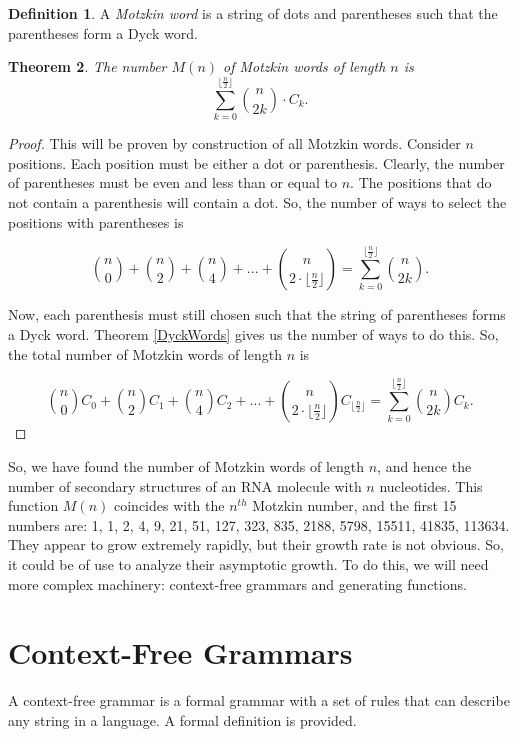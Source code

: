 \documentclass[11pt]{amsart}
\theoremstyle{plain}%
\newtheorem{thm}{Theorem}[section]
\theoremstyle{definition}
\newtheorem{defin}[thm]{{Definition}}
\theoremstyle{remark}
\numberwithin{equation}{thm}
\begin{document}
\begin{defin}
A \textit{Motzkin word} is a string of dots and parentheses such that the parentheses form a Dyck word.
\end{defin}

\begin{thm}
    The number $M(n)$ of Motzkin words of length $n$ is 
    $$\sum_{k=0}^{\lfloor \frac{n}{2}\rfloor} \binom{n}{2k} \cdot C_k.$$
\end{thm}

\begin{proof}
    This will be proven by construction of all Motzkin words. Consider $n$ positions. Each position must be either a dot or parenthesis. Clearly, the number of parentheses must be even and less than or equal to $n$. The positions that do not contain a parenthesis will contain a dot. So, the number of ways to select the positions with parentheses is
    
    $$\binom{n}{0} + \binom{n}{2} + \binom{n}{4} + ... + \binom{n}{2\cdot\lfloor\frac{n}{2}\rfloor}= \sum_{k=0}^{\lfloor \frac{n}{2}\rfloor} \binom{n}{2k}.$$
    
    Now, each parenthesis must still chosen such that the string of parentheses forms a Dyck word. Theorem \ref{DyckWords} gives us the number of ways to do this. So, the total number of Motzkin words of length $n$ is
    
    $$\binom{n}{0}C_0 + \binom{n}{2}C_1 + \binom{n}{4}C_2 + ... + \binom{n}{2\cdot\lfloor\frac{n}{2}\rfloor}C_{\lfloor\frac{n}{2}\rfloor} = \sum_{k=0}^{\lfloor \frac{n}{2}\rfloor} \binom{n}{2k}C_k.$$
\end{proof}

So, we have found the number of Motzkin words of length $n$, and hence the number of secondary structures of an RNA molecule with $n$ nucleotides. This function $M(n)$ coincides with the $n^{th}$ Motzkin number, and the first 15 numbers are: 1, 1, 2, 4, 9, 21, 51, 127, 323, 835, 2188, 5798, 15511, 41835, 113634. They appear to grow extremely rapidly, but their growth rate is not obvious. So, it could be of use to analyze their asymptotic growth. To do this, we will need more complex machinery: context-free grammars and generating functions.

\section{Context-Free Grammars}
A context-free grammar is a formal grammar with a set of rules that can describe any string in a language. A formal definition is provided.
\end{document}
